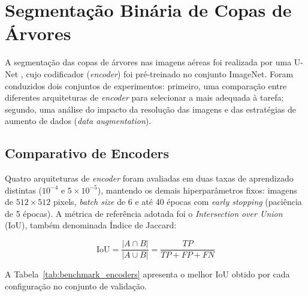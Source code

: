 \section{Segmentação Binária de Copas de Árvores}\label{sec:result_seg}

A segmentação das copas de árvores nas imagens aéreas foi realizada por uma U-Net \cite{ronneberger2015u}, cujo codificador (\textit{encoder}) foi pré-treinado no conjunto ImageNet. Foram conduzidos dois conjuntos de experimentos: primeiro, uma comparação entre diferentes arquiteturas de \textit{encoder} para selecionar a mais adequada à tarefa; segundo, uma análise do impacto da resolução das imagens e das estratégias de aumento de dados (\textit{data augmentation}).

\subsection{Comparativo de Encoders}\label{sec:bench_enc}

Quatro arquiteturas de \textit{encoder} foram avaliadas em duas taxas de aprendizado distintas ($10^{-4}$ e $5 \times 10^{-5}$), mantendo os demais hiperparâmetros fixos: imagens de $512 \times 512$ pixels, \textit{batch size} de 6 e até 40 épocas com \textit{early stopping} (paciência de 5 épocas). A métrica de referência adotada foi o \textit{Intersection over Union} (IoU), também denominada Índice de Jaccard:

\begin{equation}
    \text{IoU} = \frac{|A \cap B|}{|A \cup B|} = \frac{TP}{TP + FP + FN}
    \label{eq:iou}
\end{equation}

A Tabela~\ref{tab:benchmark_encoders} apresenta o melhor IoU obtido por cada configuração no conjunto de validação.

